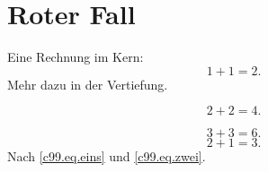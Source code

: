 \chapter{Roter Fall}\label{c99}

Eine Rechnung im Kern:
\begin{equation}\label{c99.eq.eins}
  1 + 1 = 2.
\end{equation}
Mehr dazu in der Vertiefung.

\begin{vertiefung}[id=c99.v1, titel={Tiefer}, wozu={Zeigt eine zweite Rechnung.},
    voraussetzung={Gleichung~\eqref{c99.eq.eins}.}, zurueck={Es bleibt bei zwei.}]
  \begin{equation}\label{c99.eq.tief}
    2 + 2 = 4.
  \end{equation}
\end{vertiefung}

\iftpcdepthshown
\begin{equation}\label{c99.eq.extra}
  3 + 3 = 6.
\end{equation}
\fi
\begin{equation}\label{c99.eq.zwei}
  2 + 1 = 3.
\end{equation}
Nach \eqref{c99.eq.eins} und \eqref{c99.eq.zwei}.
